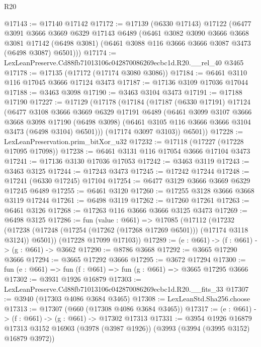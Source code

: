 \begin{lexlean}{R20}
\begin{coremodule}
@17143 := @17140 @17142
@17172 := @17139
    (@6330 @17143)
    @17122
    (@6477
      @3091
      @3666
      @3669
      @6329
      @17143
      @6489
      (@6461
        @3082
        @3090
        @3666
        @3668
        @3081
        @17142
        (@6498 @3081)
        (@6461 @3088 @116 @3666 @3666 @3087 @3473 (@6498 @3087) @6501)))
@17174 := LexLeanPreserve.Cd88fb71013106c042870086269ecbc1d.R20.__rel_40 @3465
@17178 := @17135 (@17172 (@17174 @3080 @3086))
@17184 := @6461 @3110 @116 @17045 @3666 @17124 @3473
@17187 := @17136 @3109 @17036 @17044
@17188 := @3463 @3098
@17190 := @3463 @3104 @3473
@17191 := @17188 @17190
@17227 := @17129
    (@17178
      (@17184
        (@17187
          (@6330 @17191)
          @17124
          (@6477
            @3108
            @3666
            @3669
            @6329
            @17191
            @6489
            (@6461
              @3099
              @3107
              @3666
              @3668
              @3098
              @17190
              (@6498 @3098)
              (@6461 @3105 @116 @3666 @3666 @3104 @3473 (@6498 @3104) @6501)))
          (@17174 @3097 @3103))
        @6501))
@17228 := LexLeanPreservation.prim_bitXor_u32
@17232 := @17118 (@17227 (@17228 @17095 @17098))
@17238 := @6461 @3131 @116 @17054 @3666 @17104 @3473
@17241 := @17136 @3130 @17036 @17053
@17242 := @3463 @3119
@17243 := @3463 @3125
@17244 := @17243 @3473
@17245 := @17242 @17244
@17248 := @17241 (@6330 @17245) @17104
@17254 := @6477 @3129 @3666 @3669 @6329 @17245 @6489
@17255 := @6461 @3120
@17260 := @17255 @3128 @3666 @3668 @3119 @17244
@17261 := @6498 @3119
@17262 := @17260 @17261
@17263 := @6461 @3126
@17268 := @17263 @116 @3666 @3666 @3125 @3473
@17269 := @6498 @3125
@17286 := fun (value : @661) =>
  @17085
    (@17112
      (@17232 (@17238 (@17248 (@17254 (@17262 (@17268 @17269 @6501))) (@17174 @3118 @3124)) @6501))
      (@17228 @17099 @17103))
@17289 := (e : @661) -> (f : @661) -> (g : @661) -> @3662
@17290 := @8786 @3668
@17292 := @3665 @17290 @3666
@17294 := @3665 @17292 @3666
@17295 := @3672 @17294
@17300 := fun (e : @661) => fun (f : @661) => fun (g : @661) => @3665 @17295 @3666
@17302 := @3931 @1926 @16879
@17303 := LexLeanPreserve.Cd88fb71013106c042870086269ecbc1d.R20.__fits_33
@17307 := @3940 (@17303 @4086 @3684 @3465)
@17308 := LexLeanStd.Sha256.choose
@17313 := @17307 (@660 (@17308 @4086 @3684 @3465))
@17317 := (e : @661) -> (f : @661) -> (g : @661) -> @17302 @17313
@17331 := @3954
    @1926
    @16879
    @17313
    @3152
    @16903
    (@3978 (@3987 @1926))
    (@3993 (@3994 (@3995 @3152) @16879 @3972))

\end{coremodule}
\end{lexlean}
